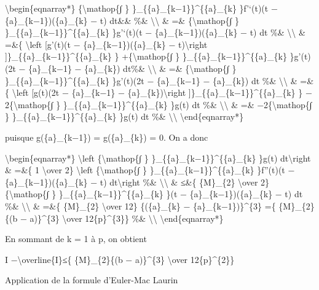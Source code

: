 \documentclass[]{article}
\begin{document}
\textbackslash{}begin\{eqnarray*\} \{\textbackslash{}mathop\{∫ \}
\}\_\{\{a\}\_\{k−1\}\}\^{}\{\{a\}\_\{k\} \}f'`(t)(t −
\{a\}\_\{k−1\})(\{a\}\_\{k\} − t) dt\&\& \%\&
\textbackslash{}\textbackslash{} \& =\& \{\textbackslash{}mathop\{∫ \}
\}\_\{\{a\}\_\{k−1\}\}\^{}\{\{a\}\_\{k\} \}g'`(t)(t −
\{a\}\_\{k−1\})(\{a\}\_\{k\} − t) dt \%\&
\textbackslash{}\textbackslash{} \& =\&\{ \textbackslash{}left
{[}g'(t)(t − \{a\}\_\{k−1\})(\{a\}\_\{k\} − t)\textbackslash{}right
{]}\}\_\{\{a\}\_\{k−1\}\}\^{}\{\{a\}\_\{k\} \}
+\{\textbackslash{}mathop\{∫ \} \}\_\{\{a\}\_\{k−1\}\}\^{}\{\{a\}\_\{k\}
\}g'(t)(2t − \{a\}\_\{k−1\} − \{a\}\_\{k\}) dt\%\&
\textbackslash{}\textbackslash{} \& =\& \{\textbackslash{}mathop\{∫ \}
\}\_\{\{a\}\_\{k−1\}\}\^{}\{\{a\}\_\{k\} \}g'(t)(2t − \{a\}\_\{k−1\} −
\{a\}\_\{k\}) dt \%\& \textbackslash{}\textbackslash{} \& =\&\{
\textbackslash{}left {[}g(t)(2t − \{a\}\_\{k−1\} −
\{a\}\_\{k\})\textbackslash{}right
{]}\}\_\{\{a\}\_\{k−1\}\}\^{}\{\{a\}\_\{k\} \} −
2\{\textbackslash{}mathop\{∫ \} \}\_\{\{a\}\_\{k−1\}\}\^{}\{\{a\}\_\{k\}
\}g(t) dt \%\& \textbackslash{}\textbackslash{} \& =\&
−2\{\textbackslash{}mathop\{∫ \}
\}\_\{\{a\}\_\{k−1\}\}\^{}\{\{a\}\_\{k\} \}g(t) dt \%\&
\textbackslash{}\textbackslash{} \textbackslash{}end\{eqnarray*\}

puisque g(\{a\}\_\{k−1\}) = g(\{a\}\_\{k\}) = 0. On a donc

\textbackslash{}begin\{eqnarray*\} \textbackslash{}left
\textbar{}\{\textbackslash{}mathop\{∫ \}
\}\_\{\{a\}\_\{k−1\}\}\^{}\{\{a\}\_\{k\} \}g(t) dt\textbackslash{}right
\textbar{}\& =\&\{ 1 \textbackslash{}over 2\} \textbackslash{}left
\textbar{}\{\textbackslash{}mathop\{∫ \}
\}\_\{\{a\}\_\{k−1\}\}\^{}\{\{a\}\_\{k\} \}f''(t)(t −
\{a\}\_\{k−1\})(\{a\}\_\{k\} − t) dt\textbackslash{}right \textbar{}\%\&
\textbackslash{}\textbackslash{} \& ≤\&\{ \{M\}\_\{2\}
\textbackslash{}over 2\} \{\textbackslash{}mathop\{∫ \}
\}\_\{\{a\}\_\{k−1\}\}\^{}\{\{a\}\_\{k\} \}(t −
\{a\}\_\{k−1\})(\{a\}\_\{k\} − t) dt \%\&
\textbackslash{}\textbackslash{} \& =\&\{ \{M\}\_\{2\}
\textbackslash{}over 12\} \{(\{a\}\_\{k\} − \{a\}\_\{k−1\})\}\^{}\{3\}
=\{ \{M\}\_\{2\}\{(b − a)\}\^{}\{3\} \textbackslash{}over
12\{p\}\^{}\{3\}\} \%\& \textbackslash{}\textbackslash{}
\textbackslash{}end\{eqnarray*\}

En sommant de k = 1 à p, on obtient

\textbar{}I −\textbackslash{}overline\{I\}\textbar{}≤\{ \{M\}\_\{2\}\{(b
− a)\}\^{}\{3\} \textbackslash{}over 12\{p\}\^{}\{2\}\}

Application de la formule d'Euler-Mac Laurin
\end{document}
